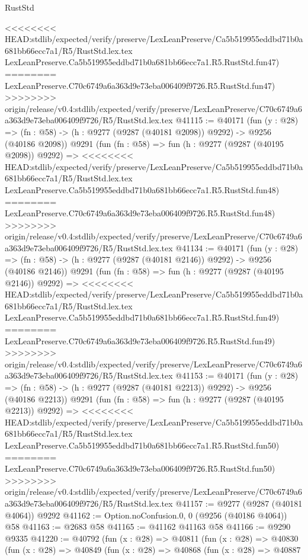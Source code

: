 \begin{lexlean}{RustStd}
\begin{coremodule}
{\begin{coremodule}
{{{{{{{{{{{{{{{{{{{{{{{{{{{{{{{{{{{{{{{{{{{{{{{{{{{{{{{<<<<<<<< HEAD:stdlib/expected/verify/preserve/LexLeanPreserve/Ca5b519955eddbd71b0a681bb66ecc7a1/R5/RustStd.lex.tex
    LexLeanPreserve.Ca5b519955eddbd71b0a681bb66ecc7a1.R5.RustStd.fun47)
========
    LexLeanPreserve.C70c6749a6a363d9e73eba006409f9726.R5.RustStd.fun47)
>>>>>>>> origin/release/v0.4:stdlib/expected/verify/preserve/LexLeanPreserve/C70c6749a6a363d9e73eba006409f9726/R5/RustStd.lex.tex
@41115 := @40171
    (fun (y : @28) =>
    (fn : @58) -> (h : @9277 (@9287 (@40181 @2098)) @9292) -> @9256 (@40186 @2098))
    @9291
    (fun (fn : @58) =>
    fun (h : @9277 (@9287 (@40195 @2098)) @9292) =>
<<<<<<<< HEAD:stdlib/expected/verify/preserve/LexLeanPreserve/Ca5b519955eddbd71b0a681bb66ecc7a1/R5/RustStd.lex.tex
    LexLeanPreserve.Ca5b519955eddbd71b0a681bb66ecc7a1.R5.RustStd.fun48)
========
    LexLeanPreserve.C70c6749a6a363d9e73eba006409f9726.R5.RustStd.fun48)
>>>>>>>> origin/release/v0.4:stdlib/expected/verify/preserve/LexLeanPreserve/C70c6749a6a363d9e73eba006409f9726/R5/RustStd.lex.tex
@41134 := @40171
    (fun (y : @28) =>
    (fn : @58) -> (h : @9277 (@9287 (@40181 @2146)) @9292) -> @9256 (@40186 @2146))
    @9291
    (fun (fn : @58) =>
    fun (h : @9277 (@9287 (@40195 @2146)) @9292) =>
<<<<<<<< HEAD:stdlib/expected/verify/preserve/LexLeanPreserve/Ca5b519955eddbd71b0a681bb66ecc7a1/R5/RustStd.lex.tex
    LexLeanPreserve.Ca5b519955eddbd71b0a681bb66ecc7a1.R5.RustStd.fun49)
========
    LexLeanPreserve.C70c6749a6a363d9e73eba006409f9726.R5.RustStd.fun49)
>>>>>>>> origin/release/v0.4:stdlib/expected/verify/preserve/LexLeanPreserve/C70c6749a6a363d9e73eba006409f9726/R5/RustStd.lex.tex
@41153 := @40171
    (fun (y : @28) =>
    (fn : @58) -> (h : @9277 (@9287 (@40181 @2213)) @9292) -> @9256 (@40186 @2213))
    @9291
    (fun (fn : @58) =>
    fun (h : @9277 (@9287 (@40195 @2213)) @9292) =>
<<<<<<<< HEAD:stdlib/expected/verify/preserve/LexLeanPreserve/Ca5b519955eddbd71b0a681bb66ecc7a1/R5/RustStd.lex.tex
    LexLeanPreserve.Ca5b519955eddbd71b0a681bb66ecc7a1.R5.RustStd.fun50)
========
    LexLeanPreserve.C70c6749a6a363d9e73eba006409f9726.R5.RustStd.fun50)
>>>>>>>> origin/release/v0.4:stdlib/expected/verify/preserve/LexLeanPreserve/C70c6749a6a363d9e73eba006409f9726/R5/RustStd.lex.tex
@41157 := @9277 (@9287 (@40181 @4064)) @9292
@41162 := Option.noConfusion.{0, 0} (@9256 (@40186 @4064)) @58
@41163 := @2683 @58
@41165 := @41162 @41163 @58
@41166 := @9290 @9335
@41220 := @40792
    (fun (x : @28) =>
    @40811
      (fun (x : @28) =>
      @40830
        (fun (x : @28) =>
        @40849
          (fun (x : @28) =>
          @40868
            (fun (x : @28) =>
            @40887
}}}}}}}}}}}}}}}}}}}}}}}}}}}}}}}}}}}}}}}}}}}}}}}}}}}}}}}
\end{coremodule}}
\end{coremodule}
\end{lexlean}
